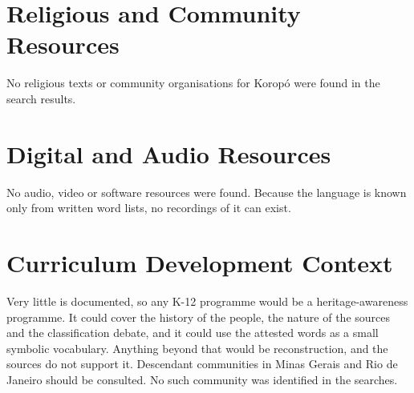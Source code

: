 \documentclass[12pt]{article}
\begin{document}
\section{Religious and Community Resources}
No religious texts or community organisations for Koropó were found in the search results.

\section{Digital and Audio Resources}
No audio, video or software resources were found. Because the language is known only from written word lists, no recordings of it can exist.

\section{Curriculum Development Context}
Very little is documented, so any K-12 programme would be a heritage-awareness programme. It could cover the history of the people, the nature of the sources and the classification debate, and it could use the attested words as a small symbolic vocabulary. Anything beyond that would be reconstruction, and the sources do not support it. Descendant communities in Minas Gerais and Rio de Janeiro should be consulted. No such community was identified in the searches.
\end{document}

